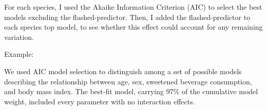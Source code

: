 For each species, I used the Akaike Information Criterion (AIC) to select the best models excluding the flashed-predictor.
Then, I added the flashed-predictor to each species top model, to see whether this effect could account for any remaining variation.


Example: 

We used AIC model selection to distinguish among a set of possible models describing the relationship between age, sex, sweetened beverage consumption, and body mass index.
The best-fit model, carrying 97\% of the cumulative model weight, included every parameter with no interaction effects.



